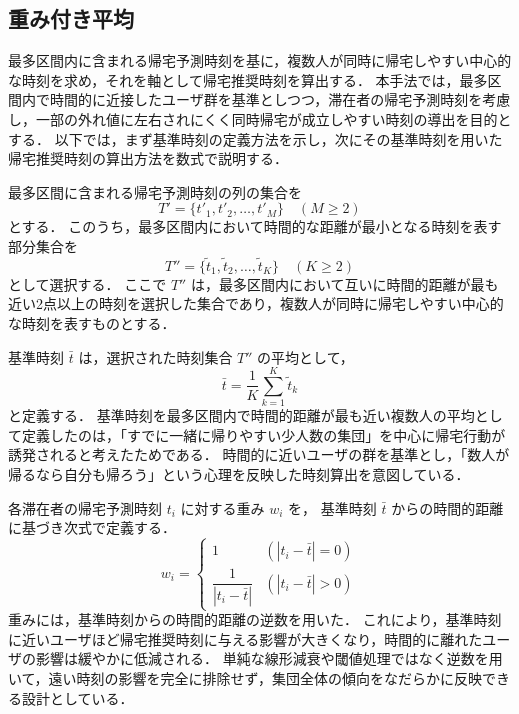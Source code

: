 \subsection{重み付き平均}
最多区間内に含まれる帰宅予測時刻を基に，複数人が同時に帰宅しやすい中心的な時刻を求め，それを軸として帰宅推奨時刻を算出する．
本手法では，最多区間内で時間的に近接したユーザ群を基準としつつ，滞在者の帰宅予測時刻を考慮し，一部の外れ値に左右されにくく同時帰宅が成立しやすい時刻の導出を目的とする．
以下では，まず基準時刻の定義方法を示し，次にその基準時刻を用いた帰宅推奨時刻の算出方法を数式で説明する．



最多区間に含まれる帰宅予測時刻の列の集合を
\[
  T' = \{ t'_1, t'_2, \dots, t'_M \} \quad (M \geq 2)
\]
とする．
このうち，最多区間内において時間的な距離が最小となる時刻を表す部分集合を
\[
  T'' = \{ \tilde{t}_1, \tilde{t}_2, \dots, \tilde{t}_K \} \quad (K \geq 2)
\]
として選択する．
ここで $T''$ は，最多区間内において互いに時間的距離が最も近い2点以上の時刻を選択した集合であり，複数人が同時に帰宅しやすい中心的な時刻を表すものとする．


基準時刻 $\bar{t}$ は，選択された時刻集合 $T''$ の平均として，
\[
  \bar{t} = \frac{1}{K} \sum_{k=1}^{K} \tilde{t}_k
\]
と定義する．
基準時刻を最多区間内で時間的距離が最も近い複数人の平均として定義したのは，「すでに一緒に帰りやすい少人数の集団」を中心に帰宅行動が誘発されると考えたためである．
時間的に近いユーザの群を基準とし，「数人が帰るなら自分も帰ろう」という心理を反映した時刻算出を意図している．


各滞在者の帰宅予測時刻 $t_i$ に対する重み $w_i$ を，
基準時刻 $\bar{t}$ からの時間的距離に基づき次式で定義する．
\[
  w_i =
  \begin{cases}
    1                          & (|t_i - \bar{t}| = 0) \\
    \dfrac{1}{|t_i - \bar{t}|} & (|t_i - \bar{t}| > 0)
  \end{cases}
\]
重みには，基準時刻からの時間的距離の逆数を用いた．
これにより，基準時刻に近いユーザほど帰宅推奨時刻に与える影響が大きくなり，時間的に離れたユーザの影響は緩やかに低減される．
単純な線形減衰や閾値処理ではなく逆数を用いて，遠い時刻の影響を完全に排除せず，集団全体の傾向をなだらかに反映できる設計としている．


